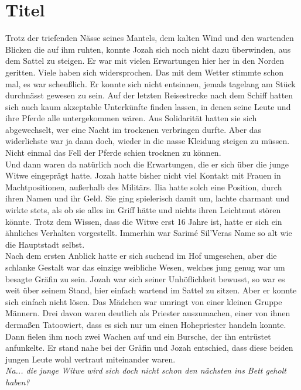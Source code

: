 \chapter{Titel}

Trotz der triefenden Nässe seines Mantels, dem kalten Wind und den wartenden Blicken die auf ihm 
ruhten, konnte Jozah sich noch nicht dazu überwinden, aus dem Sattel zu steigen. Er war mit vielen 
Erwartungen hier her in den Norden geritten. Viele haben sich widersprochen. Das mit dem Wetter 
stimmte schon mal, es war scheußlich. Er konnte sich nicht entsinnen, jemals tagelang am Stück 
durchnässt gewesen zu sein. Auf der letzten Reisestrecke nach dem Schiff hatten sich auch kaum 
akzeptable Unterkünfte finden lassen, in denen seine Leute und ihre Pferde alle untergekommen 
wären. Aus Solidarität hatten sie sich abgewechselt, wer eine Nacht im trockenen verbringen durfte. 
Aber das widerlichste war ja dann doch, wieder in die nasse Kleidung steigen zu müssen. Nicht 
einmal das Fell der Pferde schien trocknen zu können.\\
Und dann waren da natürlich noch die Erwartungen, die er sich über die junge Witwe eingeprägt 
hatte. Jozah hatte bisher nicht viel Kontakt mit Frauen in Machtpositionen, außerhalb des Militärs. 
Ilia hatte solch eine Position, durch ihren Namen und ihr Geld. Sie ging spielerisch damit um, 
lachte charmant und wirkte stets, als ob sie alles im Griff hätte und nichts ihren Leichtmut stören 
könnte. Trotz dem Wissen, dass die Witwe erst 16 Jahre ist, hatte er sich ein ähnliches Verhalten 
vorgestellt. Immerhin war Sarimé Sil'Veras Name so alt wie die Hauptstadt selbst.\\
Nach dem ersten Anblick hatte er sich suchend im Hof umgesehen, aber die schlanke Gestalt war das 
einzige weibliche Wesen, welches jung genug war um besagte Gräfin zu sein. Jozah war sich seiner 
Unhöflichkeit bewusst, so war es weit über seinem Stand, hier einfach wartend im Sattel zu sitzen. 
Aber er konnte sich einfach nicht lösen. Das Mädchen war umringt von einer kleinen Gruppe Männern. 
Drei davon waren deutlich als Priester auszumachen, einer von ihnen dermaßen Tatoowiert, dass es 
sich nur um einen Hohepriester handeln konnte. Dann fielen ihm noch zwei Wachen auf und ein 
Bursche, der ihn entrüstet anfunkelte. Er stand nahe bei der Gräfin und Jozah entschied, dass diese 
beiden jungen Leute wohl vertraut miteinander waren.\\
\textit{Na... die junge Witwe wird sich doch nicht schon den nächsten ins Bett geholt haben?}\\
